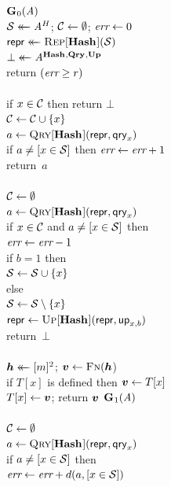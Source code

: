 \begin{figure}
  {
    \underline{$\G_0(\advA)$}\\[2pt]
      $\col \getsr \advA^H$; $\setC \gets \emptyset$; $\err \gets 0$\\
      $\pub \getsr \Rep[\HASHO](\col)$\\
      $\bot \getsr \advA^{\HASHO,\QRYO,\UPO}$\\
      return $(\err \geq r)$
    \\[6pt]
    \\[2pt]
      if $x \in \setC$ then return $\bot$\\
      $\setC \gets \setC \union \{x\}$\\
      $a \gets \Qry[\HASHO](\pub, \qry_x)$\\
      if $a \neq [x \in \col]$ then $\err \gets \err + 1$\\
      return~$a$
    \\[6pt]
    \\[2pt]
      $\setC \gets \emptyset$\\
      $a \gets \Qry[\HASHO](\pub, \qry_x)$\\
      if $x \in \setC$ and $a \neq [x \in \col]$ then\\
      \tab $\err \gets \err-1$\\
      if $b = 1$ then\\
      \tab $\col \gets \col \cup \{x\}$\\
      else\\
      \tab $\col \gets \col \setminus \{x\}$\\
      $\pub \gets \Up[\HASHO](\pub,\up_{x,b})$\\
      return~$\bot$
    \\[6pt]
    \\
      $\hh \getsr [m]^2$; $\vv \gets \fff(\hh$)\\
      if $T[x]$ is defined then $\vv \gets T[x]$\\
      $T[x] \gets \vv$;
      return $\vv$
  }
  {
    \underline{$\G_1(\advA)$}\\[2pt]
    \\[2pt]
      $\setC \gets \emptyset$\\
      $a \gets \Qry[\HASHO](\pub, \qry_x)$\\
      if $a \neq [x \in \col]$ then\\
      \tab $\err \gets \err+d(a,[x \in \col])$\\
}
\end{figure}
